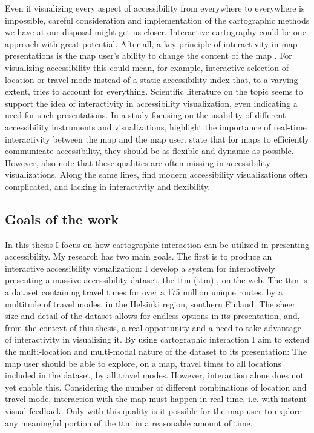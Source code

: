 Even if visualizing every aspect of accessibility
from everywhere to everywhere is impossible,
careful consideration and implementation
of the cartographic methods we have at our disposal might get us closer.
Interactive cartography could be one approach with great potential.
After all, a key principle of interactivity in map presentations is
the map user's ability to change the content of the map \parencite{rot2013b}.
For visualizing accessibility this could mean, for example,
interactive selection of location or travel mode instead of
a static accessibility index that, to a varying extent,
tries to account for everything.
Scientific literature on the topic seems to support the idea of
interactivity in accessibility visualization,
even indicating a need for such presentations.
In a study focusing on the usability of
different accessibility instruments and visualizations,  %
\textcite{te2014} highlight the importance of
real-time interactivity between the map and the map user.
\textcite{but2018} state that for maps to efficiently communicate accessibility,
they should be as flexible and dynamic as possible.
However, \textcite{but2018} also note that
these qualities are often missing in accessibility visualizations.
Along the same lines,
\textcite{paj2021} find modern accessibility visualizations often complicated,
and lacking in interactivity and flexibility.


\subsection{Goals of the work}

In this thesis I focus on
how cartographic interaction can be utilized in presenting accessibility.
My research has two main goals.
The first is to produce an interactive accessibility visualization: %
I develop a system for interactively presenting a massive accessibility dataset,
the \acrlong{ttm} (\acrshort{ttm}) \parencite{fin2023},
on the web.  %
The \acrshort{ttm} is a dataset containing travel times for
over a 175 million unique routes, by a multitude of travel modes,
in the Helsinki region, southern Finland.
The sheer size and detail of the dataset allows for endless options
in its presentation, and, from the context of this thesis,
a real opportunity and a need to take advantage of interactivity in visualizing it.
By using cartographic interaction
I aim to extend the multi-location and multi-modal nature of the dataset
to its presentation:
The map user should be able to explore, on a map,
travel times to all locations included in the dataset,
by all travel modes.
However, interaction alone does not yet enable this.
Considering the number of different combinations of location and travel mode,
interaction with the map must happen in real-time,
i.e. with instant visual feedback.
Only with this quality is it possible for the map user to
explore any meaningful portion of the \acrshort{ttm}
in a reasonable amount of time.

